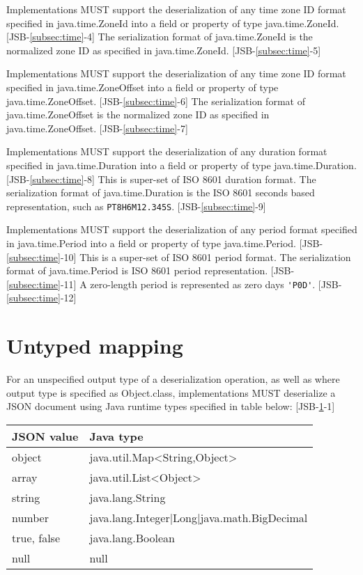 Implementations MUST support the deserialization of any time zone ID format specified in java.time.ZoneId into a field or property of type java.time.ZoneId. [JSB-\ref{subsec:time}-4]
The serialization format of java.time.ZoneId is the normalized zone ID as specified in java.time.ZoneId. [JSB-\ref{subsec:time}-5]

Implementations MUST support the deserialization of any time zone ID format specified in java.time.ZoneOffset into a field or property of type java.time.ZoneOffset. [JSB-\ref{subsec:time}-6]
The serialization format of java.time.ZoneOffset is the normalized zone ID as specified in java.time.ZoneOffset. [JSB-\ref{subsec:time}-7]

Implementations MUST support the deserialization of any duration format specified in java.time.Duration into a field or property of type java.time.Duration. [JSB-\ref{subsec:time}-8] This is super-set of ISO 8601 duration format.
The serialization format of java.time.Duration is the ISO 8601 seconds based representation, such as
\verb|PT8H6M12.345S|. [JSB-\ref{subsec:time}-9]

Implementations MUST support the deserialization of any period format specified in java.time.Period into a field or property of type java.time.Period. [JSB-\ref{subsec:time}-10] 
This is a super-set of ISO 8601 period format.
The serialization format of java.time.Period is ISO 8601 period representation. [JSB-\ref{subsec:time}-11] 
A zero-length period is represented as zero days \verb|'P0D'|. [JSB-\ref{subsec:time}-12]


\section{Untyped mapping}
\label{sec:untyped}
For an unspecified output type of a deserialization operation, as well as where output type is specified as Object.class, implementations MUST deserialize a JSON document using Java runtime types specified in table below: [JSB-\ref{sec:untyped}-1]

\begin{tabularx}{\textwidth}{ |X|X| }
\hline
JSON value & Java type \\ 
\hline
object & java.util.Map\textless String,Object\textgreater\\
array & java.util.List\textless Object\textgreater \\
string & java.lang.String \\
number & java.lang.Integer|Long|java.math.BigDecimal \\
true, false & java.lang.Boolean \\
null & null \\
\hline
\end{tabularx}

